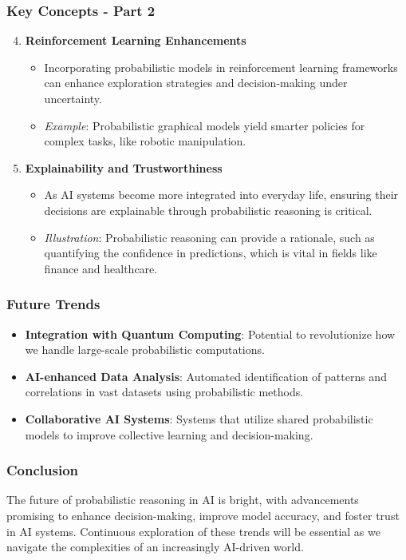 \documentclass[aspectratio=169]{beamer}
\begin{document}
\begin{frame}[fragile]
    \frametitle{Key Concepts - Part 2}
    \begin{enumerate}
        \setcounter{enumi}{3} %
        \item \textbf{Reinforcement Learning Enhancements}
        \begin{itemize}
            \item Incorporating probabilistic models in reinforcement learning frameworks can enhance exploration strategies and decision-making under uncertainty.
            \item \textit{Example}: Probabilistic graphical models yield smarter policies for complex tasks, like robotic manipulation.
        \end{itemize}

        \item \textbf{Explainability and Trustworthiness}
        \begin{itemize}
            \item As AI systems become more integrated into everyday life, ensuring their decisions are explainable through probabilistic reasoning is critical.
            \item \textit{Illustration}: Probabilistic reasoning can provide a rationale, such as quantifying the confidence in predictions, which is vital in fields like finance and healthcare.
        \end{itemize}
    \end{enumerate}
\end{frame}

\begin{frame}[fragile]
    \frametitle{Future Trends}
    \begin{itemize}
        \item \textbf{Integration with Quantum Computing}: Potential to revolutionize how we handle large-scale probabilistic computations.
        \item \textbf{AI-enhanced Data Analysis}: Automated identification of patterns and correlations in vast datasets using probabilistic methods.
        \item \textbf{Collaborative AI Systems}: Systems that utilize shared probabilistic models to improve collective learning and decision-making.
    \end{itemize}
\end{frame}

\begin{frame}[fragile]
    \frametitle{Conclusion}
    The future of probabilistic reasoning in AI is bright, with advancements promising to enhance decision-making, improve model accuracy, and foster trust in AI systems. Continuous exploration of these trends will be essential as we navigate the complexities of an increasingly AI-driven world.
\end{frame}
\end{document}
